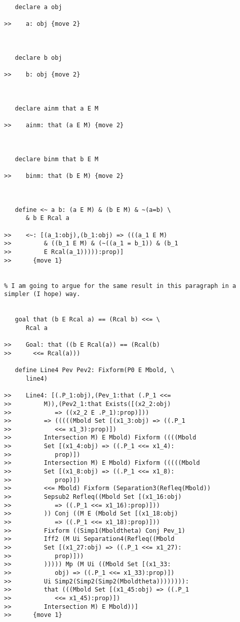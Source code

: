 \documentclass[12pt]{article}
\begin{document}
\begin{verbatim}
   declare a obj

>>    a: obj {move 2}



   declare b obj

>>    b: obj {move 2}



   declare ainm that a E M

>>    ainm: that (a E M) {move 2}



   declare binm that b E M

>>    binm: that (b E M) {move 2}



   define <~ a b: (a E M) & (b E M) & ~(a=b) \
      & b E Rcal a

>>    <~: [(a_1:obj),(b_1:obj) => (((a_1 E M)
>>         & ((b_1 E M) & (~((a_1 = b_1)) & (b_1
>>         E Rcal(a_1))))):prop)]
>>      {move 1}


% I am going to argue for the same result in this paragraph in a simpler (I hope) way.


   goal that (b E Rcal a) == (Rcal b) <<= \
      Rcal a

>>    Goal: that ((b E Rcal(a)) == (Rcal(b)
>>      <<= Rcal(a)))

   define Line4 Pev Pev2: Fixform(P0 E Mbold, \
      line4)

>>    Line4: [(.P_1:obj),(Pev_1:that (.P_1 <<=
>>         M)),(Pev2_1:that Exists([(x2_2:obj)
>>            => ((x2_2 E .P_1):prop)]))
>>         => (((((Mbold Set [(x1_3:obj) => ((.P_1
>>            <<= x1_3):prop)])
>>         Intersection M) E Mbold) Fixform ((((Mbold
>>         Set [(x1_4:obj) => ((.P_1 <<= x1_4):
>>            prop)])
>>         Intersection M) E Mbold) Fixform (((((Mbold
>>         Set [(x1_8:obj) => ((.P_1 <<= x1_8):
>>            prop)])
>>         <<= Mbold) Fixform (Separation3(Refleq(Mbold))
>>         Sepsub2 Refleq((Mbold Set [(x1_16:obj)
>>            => ((.P_1 <<= x1_16):prop)]))
>>         )) Conj ((M E (Mbold Set [(x1_18:obj)
>>            => ((.P_1 <<= x1_18):prop)]))
>>         Fixform ((Simp1(Mboldtheta) Conj Pev_1)
>>         Iff2 (M Ui Separation4(Refleq((Mbold
>>         Set [(x1_27:obj) => ((.P_1 <<= x1_27):
>>            prop)]))
>>         ))))) Mp (M Ui ((Mbold Set [(x1_33:
>>            obj) => ((.P_1 <<= x1_33):prop)])
>>         Ui Simp2(Simp2(Simp2(Mboldtheta)))))))):
>>         that (((Mbold Set [(x1_45:obj) => ((.P_1
>>            <<= x1_45):prop)])
>>         Intersection M) E Mbold))]
>>      {move 1}




\end{verbatim}
\end{document}
